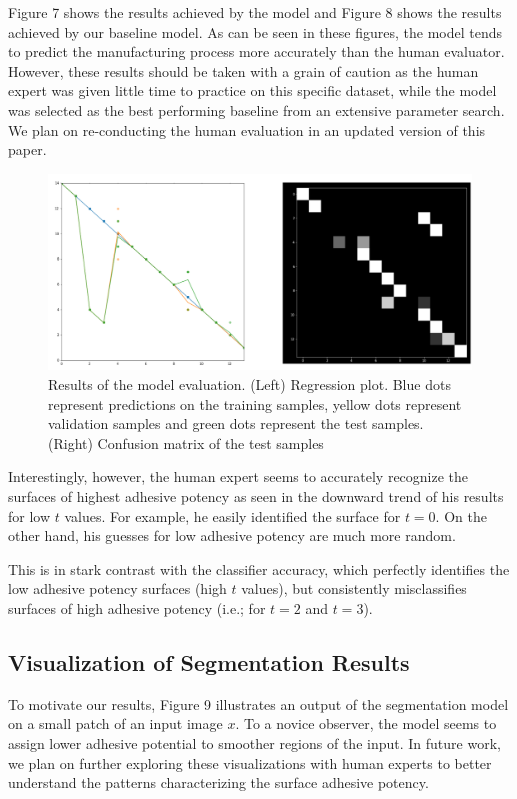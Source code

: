 \documentclass[10pt,twocolumn,letterpaper]{article}
\begin{document}
Figure 7 shows the results achieved by the model and Figure 8 shows the results achieved by our baseline model.
As can be seen in these figures, the model tends to predict the manufacturing 
process more accurately than the human evaluator.
However, these results should be taken with a grain of caution 
as the human expert was given little time to practice on this specific dataset,
while the model was selected as the best performing baseline from an extensive parameter search.
We plan on re-conducting the human evaluation in an updated version of this paper.

\begin{figure}[h]
\centering
\includegraphics[width=0.9\linewidth]{"./figures/Figure8"}
\caption{
Results of the model evaluation.
(Left) Regression plot. 
Blue dots represent predictions on the training samples, 
yellow dots represent validation samples and green dots represent the test samples.
(Right) Confusion matrix of the test samples
}
\end{figure}

Interestingly, however, the human expert seems to accurately recognize 
the surfaces of highest adhesive potency as seen in the downward trend of his results 
for low $t$ values. For example, he easily identified the surface for $t=0$.
On the other hand, his guesses for low adhesive potency are much more random.

This is in stark contrast with the classifier accuracy, which perfectly identifies
the low adhesive potency surfaces (high $t$ values), but consistently misclassifies 
surfaces of high adhesive potency (i.e.; for $t=2$ and $t=3$).

\subsection{Visualization of Segmentation Results}

To motivate our results, Figure 9 illustrates an output of the segmentation model on a small patch of an input image $x$.
To a novice observer, the model seems to assign lower adhesive potential to smoother regions of the input.
In future work, we plan on further exploring these visualizations with human experts to better understand the 
patterns characterizing the surface adhesive potency.
\end{document}
